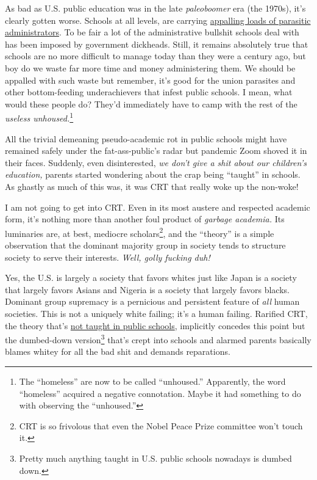 As bad as U.S. public education was in the late \emph{paleoboomer} era
(the 1970s), it's clearly gotten worse. Schools at all levels, are
carrying
\href{https://www.huffpost.com/entry/higher-ed-administrators-growth_n_4738584}{appalling
loads of parasitic administrators}. To be fair a lot of the
administrative bullshit schools deal with has been imposed by government
dickheads. Still, it remains absolutely true that schools are no more
difficult to manage today than they were a century ago, but boy do we
waste far more time and money administering them. We should be appalled
with such waste but remember, it's good for the union parasites and
other bottom-feeding underachievers that infest public schools. I mean,
what would these people do? They'd immediately have to camp with the
rest of the \emph{useless
unhoused.}\footnote{  The ``homeless'' are now to be called ``unhoused.'' Apparently, the
  word ``homeless'' acquired a negative connotation. Maybe it had
  something to do with observing the
  ``unhoused.''
}

All the trivial demeaning pseudo-academic rot in public schools might
have remained safely under the fat-ass-public's radar but pandemic Zoom
shoved it in their faces. Suddenly, even disinterested, \emph{we don't
give a shit about our children's education,} parents started wondering
about the crap being ``taught'' in schools. As ghastly as much of this
was, it was CRT that really woke up the non-woke!

I am not going to get into CRT. Even in its most austere and respected
academic form, it's nothing more than another foul product of
\emph{garbage academia.} Its luminaries are, at best, mediocre
scholars\footnote{  CRT is so frivolous that even the Nobel Peace Prize committee won't
  touch it.
}, and the ``theory''
is a simple observation that the dominant majority group in society
tends to structure society to serve their interests. \emph{Well, golly
fucking duh!}

Yes, the U.S. is largely a society that favors whites just like Japan is
a society that largely favors Asians and Nigeria is a society that
largely favors blacks. Dominant group supremacy is a pernicious and
persistent feature of \emph{all} human societies. This is not a uniquely
white failing; it's a human failing. Rarified CRT, the theory that's
\href{https://dailycaller.com/2021/07/29/critical-race-theory-law-school-antiracism/}{not
taught in public schools}, implicitly concedes this point but the
dumbed-down version\footnote{  Pretty much anything taught in U.S. public schools nowadays is dumbed
  down.
} that's crept into schools and alarmed parents basically blames whitey for all
the bad shit and demands reparations.

